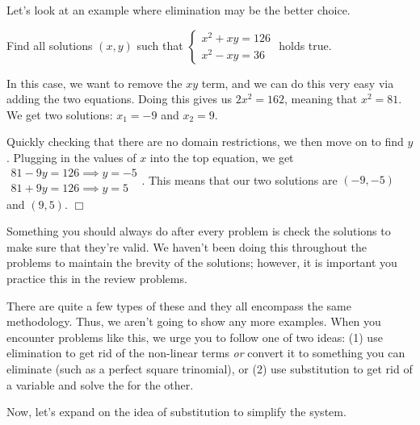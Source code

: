 \documentclass[lang=en,11pt]{elegantbook}
\begin{document}
Let's look at an example where elimination may be the better choice.
\begin{example}
Find all solutions $(x,y)$ such that $\begin{cases} x^2+xy=126 \\ x^2-xy=36 \end{cases}$ holds true.
\end{example}
\begin{solution}
In this case, we want to remove the $xy$ term, and we can do this very easy via adding the two equations.  Doing this gives us $2x^2=162$, meaning that $x^2=81$.  We get two solutions: $x_1=-9$ and $x_2=9$.  

Quickly checking that there are no domain restrictions, we then move on to find $y$.  Plugging in the values of $x$ into the top equation, we get $\begin{matrix} 81-9y=126 \implies y=-5 \\ 81+9y=126 \implies y=5 \end{matrix}$.  This means that our two solutions are $(-9,-5)$ and $(9,5)$.  $\Box$
\end{solution}
\begin{note}
Something you should always do after every problem is check the solutions to make sure that they're valid.  We haven't been doing this throughout the problems to maintain the brevity of the solutions; however, it is important you practice this in the review problems.
\end{note}
There are quite a few types of these and they all encompass the same methodology.  Thus, we aren't going to show any more examples.  When you encounter problems like this, we urge you to follow one of two ideas: (1) use elimination to get rid of the non-linear terms \textit{or} convert it to something you can eliminate (such as a perfect square trinomial), or (2) use substitution to get rid of a variable and solve the for the other.

Now, let's expand on the idea of substitution to simplify the system.
\end{document}
